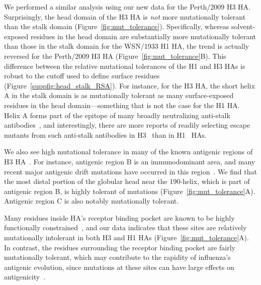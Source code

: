 \documentclass[9pt,twocolumn,twoside]{pnas-new}
\begin{document}
We performed a similar analysis using our new data for the Perth/2009 H3 HA.
Surprisingly, the head domain of the H3 HA is \emph{not} more mutationally tolerant than the stalk domain (Figure~\ref{fig:mut_tolerance}).
Specifically, whereas solvent-exposed residues in the head domain are substantially more mutationally tolerant than those in the stalk domain for the WSN/1933 H1 HA, the trend is actually reversed for the Perth/2009 H3 HA (Figure~\ref{fig:mut_tolerance}B).
This difference between the relative mutational tolerances of the H1 and H3 HAs is robust to the cutoff used to define surface residues (Figure~\ref{suppfig:head_stalk_RSA}).
For instance, for the H3 HA, the short helix A in the stalk domain is as mutationally tolerant as many surface-exposed residues in the head domain---something that is not the case for the H1 HA.
Helix A forms part of the epitope of many broadly neutralizing anti-stalk antibodies~\cite{mallajosyula2014influenza,laursen2013broadly,chai2016two}, and interestingly, there are more reports of readily selecting escape mutants from such anti-stalk antibodies in H3~\cite{ekiert2011highly, friesen2014common, chai2016two, yamayoshi2017human} than in H1~\cite{okuno1993common,doud2018quantifying,anderson2017natural} HAs.

We also see high mutational tolerance in many of the known antigenic regions of H3 HA~\cite{wiley1981structural}.
For instance, antigenic region B is an immunodominant area, and many recent major antigenic drift mutations have occurred in this region~\cite{chambers2015identification,koel2013substitutions,popova2012immunodominance}.
We find that the most distal portion of the globular head near the 190-helix, which is part of antigenic region B, is highly tolerant of mutations (Figure~\ref{fig:mut_tolerance}A).
Antigenic region C is also notably mutationally tolerant.

Many residues inside HA's receptor binding pocket are known to be highly functionally constrained~\cite{wilson1981structure,martin1998studies}, and our data indicates that these sites are relatively mutationally intolerant in both H3 and H1 HAs (Figure~\ref{fig:mut_tolerance}A).
In contrast, the residues surrounding the receptor binding pocket are fairly mutationally tolerant, which may contribute to the rapidity of influenza's antigenic evolution, since mutations at these sites can have large effects on antigenicity~\cite{wiley1981structural,koel2013substitutions}.
\end{document}
